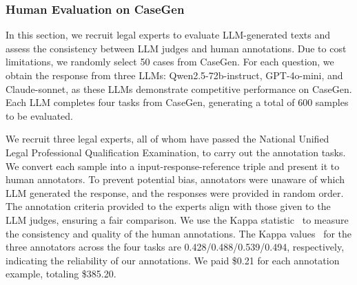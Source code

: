 




\subsubsection{Human Evaluation on CaseGen}
\label{sec:human}

In this section, we recruit legal experts to evaluate LLM-generated texts and assess the consistency between LLM judges and human annotations.
Due to cost limitations, we randomly select 50 cases from CaseGen. For each question, we obtain the response from three LLMs: Qwen2.5-72b-instruct, GPT-4o-mini, and Claude-sonnet, as these LLMs demonstrate competitive performance on CaseGen.
Each LLM completes four tasks from CaseGen, generating a total of 600 samples to be evaluated.

We recruit three legal experts, all of whom have passed the National Unified Legal Professional Qualification Examination, to carry out the annotation tasks.
We convert each sample into a input-response-reference triple and present it to human annotators.
To prevent potential bias, annotators were unaware of which LLM generated the response, and the responses were provided in random order.
The annotation criteria provided to the experts align with those given to the LLM judges, ensuring a fair comparison.
We use the Kappa statistic~\cite{warrens2015five} to measure the consistency and quality of the human annotations. The Kappa values~\cite{warrens2015five} for the three annotators across the four tasks are 0.428/0.488/0.539/0.494, respectively, indicating the reliability of our annotations. We paid \$0.21 for each annotation example, totaling \$385.20.


